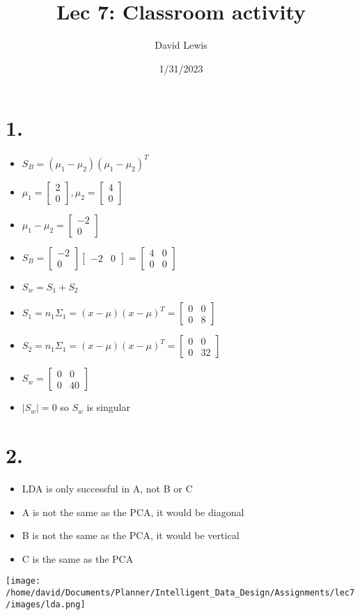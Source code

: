 \documentclass[11pt]{article}
\author{David Lewis}
\date{1/31/2023}
\title{Lec 7: Classroom activity}
\begin{document}
\maketitle
\section*{1.}
\label{sec:orgf8b63a5}
\begin{itemize}
\item \(S_B = (\mu_1-\mu_2)(\mu_1-\mu_2)^T\)
\item \(\mu_1 = \begin{bmatrix} 2 \\ 0 \end{bmatrix}, \mu_2 = \begin{bmatrix} 4 \\ 0 \end{bmatrix}\)
\item \(\mu_1-\mu_2 = \begin{bmatrix}-2 \\ 0 \end{bmatrix}\)
\item \(S_B = \begin{bmatrix}-2 \\ 0 \end{bmatrix} \begin{bmatrix}-2 & 0 \end{bmatrix}
  = \begin{bmatrix} 4 & 0 \\ 0 & 0 \end{bmatrix}\)
\item \(S_w = S_1 + S_2\)
\item \(S_1 = n_1 \Sigma_1 = (x-\mu)(x- \mu)^T = \begin{bmatrix} 0 & 0 \\ 0 & 8 \end{bmatrix}\)
\item \(S_2 = n_1 \Sigma_1 = (x-\mu)(x- \mu)^T = \begin{bmatrix} 0 & 0 \\ 0 & 32 \end{bmatrix}\)
\item \(S_w = \begin{bmatrix} 0 & 0 \\ 0 & 40 \end{bmatrix}\)
\item \(|S_w| = 0\) so \(S_w\) is singular
\end{itemize}
\section*{2.}
\label{sec:orgff7f154}
\begin{itemize}
\item LDA is only successful in A, not B or C
\item A is not the same as the PCA, it would be diagonal
\item B is not the same as the PCA, it would be vertical
\item C is the same as the PCA
\end{itemize}
\texttt{[image: /home/david/Documents/Planner/Intelligent\_Data\_Design/Assignments/lec7/images/lda.png]}
\end{document}
